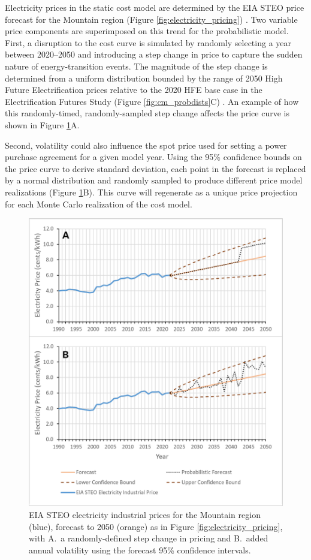 Electricity prices in the static cost model are determined by the EIA STEO price forecast for the Mountain region (Figure \ref{fig:electricity_pricing}) \citep{eia_short-term_2021}. Two variable price components are superimposed on this trend for the probabilistic model. First, a disruption to the cost curve is simulated by randomly selecting a year between 2020--2050 and introducing a step change in price to capture the sudden nature of energy-transition events. The magnitude of the step change is determined from a uniform distribution bounded by the range of 2050 High Future Electrification prices relative to the 2020 HFE base case in the Electrification Futures Study (Figure \ref{fig:cm_probdists}C) \citep{murphy_electrification_2021}. An example of how this randomly-timed, randomly-sampled step change affects the price curve is shown in Figure \ref{fig:elec_price_prob}A. 

Second, volatility could also influence the spot price used for setting a power purchase agreement for a given model year. Using the 95\% confidence bounds on the price curve to derive standard deviation, each point in the forecast is replaced by a normal distribution and randomly sampled to produce different price model realizations (Figure \ref{fig:elec_price_prob}B). This curve will regenerate as a unique price projection for each Monte Carlo realization of the cost model.

\begin{figure}[htp]
\centering
\includegraphics[width=.85\textwidth]{templates/images/Figure-ElectPrice_Prob.png}
\singlespacing
\caption[Cost model probabilistic price forecasts]{EIA STEO electricity industrial prices for the Mountain region (blue), forecast to 2050 (orange) as in Figure \ref{fig:electricity_pricing}, with A.\ a randomly-defined step change in pricing and B.\ added annual volatility using the forecast 95\% confidence intervals.}
\label{fig:elec_price_prob}
\end{figure}

